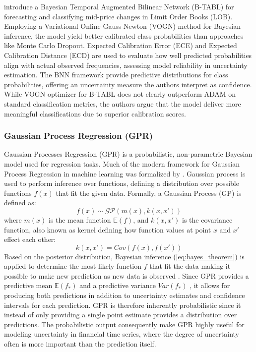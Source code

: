 \textcite{magris2023bayesian} introduce a Bayesian Temporal Augmented Bilinear Network (B-TABL) for forecasting and classifying mid-price changes in Limit Order Books (LOB). Employing a Variational Online Gauss-Newton (VOGN) method for Bayesian inference, the model yield better calibrated class probabilities than approaches like Monte Carlo Dropout. Expected Calibration Error (ECE) and Expected Calibration Distance (ECD) are used to evaluate how well predicted probabilities align with actual observed frequencies, assessing model reliability in uncertainty estimation. The BNN framework provide predictive distributions for class probabilities, offering an uncertainty measure the authors interpret as confidence. While VOGN optimizer for B-TABL does not clearly outperform ADAM on standard classification metrics, the authors argue that the model deliver more meaningful classifications due to superior calibration scores. 



\subsubsection{Gaussian Process Regression (GPR)}
Gaussian Processes Regression (GPR) is a probabilistic, non-parametric Bayesian model used for regression tasks. Much of the modern framework for Gaussian Process Regression in machine learning was formalized by \textcite{rasmussen_williams_2006}. Gaussian process is used to perform inference over functions, defining a distribution over possible functions $f(x)$  that fit the given data. Formally, a Gaussian Process (GP)  is defined as: 
\begin{equation}
f(x) \sim \mathcal{GP}(m(x), k(x, x'))
\end{equation}
where $m(x)$ is the mean function $\mathbb{E}(f)$, and $k(x, x')$ is the covariance function, also known as kernel defining how function values at point $x$ and $ x'$ effect each other:
\begin{equation}
k(x, x')=Cov(f(x),f(x'))
\end{equation}
Based on the posterior distribution, Bayesian inference (\ref{eq:bayes_theorem}) is applied to determine the most likely function $f$ that fit the data   making it possible to make new prediction as new data is observed \parencite{rasmussen_williams_2006}. Since GPR provides  a predictive mean $\mathbb{E}(f_*)$ and a predictive variance $Var(f_*)$ , it allows for producing both predictions in addition to uncertainty estimates and confidence intervals for each prediction. GPR is therefore inherently probabilistic since it instead of only providing a single point estimate provides a distribution over predictions.  The probabilistic output consequently make GPR highly useful for modeling uncertainty in financial time series, where the degree of uncertainty often is more important than the prediction itself. 

